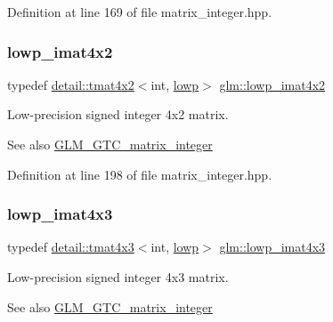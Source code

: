 Definition at line 169 of file matrix\+\_\+integer.\+hpp.

\mbox{\label{group__gtc__matrix__integer_ga0d7055814ab969df3b844ba9c52dbf61}} 
\subsubsection{\texorpdfstring{lowp\+\_\+imat4x2}{lowp\_imat4x2}}
{\footnotesize\ttfamily typedef \hyperlink{structglm_1_1detail_1_1tmat4x2}{detail\+::tmat4x2}$<$int, \hyperlink{namespaceglm_a0f04f086094c747d227af4425893f545ae161af3fc695e696ce3bf69f7332bc2d}{lowp}$>$ \hyperlink{group__gtc__matrix__integer_ga0d7055814ab969df3b844ba9c52dbf61}{glm\+::lowp\+\_\+imat4x2}}

Low-\/precision signed integer 4x2 matrix. \begin{DoxySeeAlso}{See also}
\hyperlink{group__gtc__matrix__integer}{G\+L\+M\+\_\+\+G\+T\+C\+\_\+matrix\+\_\+integer} 
\end{DoxySeeAlso}


Definition at line 198 of file matrix\+\_\+integer.\+hpp.

\mbox{\label{group__gtc__matrix__integer_ga73858cf965b0aa7e72908eb817c192d6}} 
\subsubsection{\texorpdfstring{lowp\+\_\+imat4x3}{lowp\_imat4x3}}
{\footnotesize\ttfamily typedef \hyperlink{structglm_1_1detail_1_1tmat4x3}{detail\+::tmat4x3}$<$int, \hyperlink{namespaceglm_a0f04f086094c747d227af4425893f545ae161af3fc695e696ce3bf69f7332bc2d}{lowp}$>$ \hyperlink{group__gtc__matrix__integer_ga73858cf965b0aa7e72908eb817c192d6}{glm\+::lowp\+\_\+imat4x3}}

Low-\/precision signed integer 4x3 matrix. \begin{DoxySeeAlso}{See also}
\hyperlink{group__gtc__matrix__integer}{G\+L\+M\+\_\+\+G\+T\+C\+\_\+matrix\+\_\+integer} 
\end{DoxySeeAlso}


